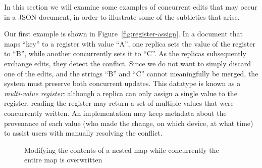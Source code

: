 \documentclass[a4paper,twocolumn,10pt]{article}
\begin{document}
In this section we will examine some examples of concurrent edits that may occur in a JSON document, in order to illustrate some of the subtleties that arise.

Our first example is shown in Figure~\ref{fig:register-assign}. In a document that maps ``key'' to a register with value ``A'', one replica sets the value of the register to ``B'', while another concurrently sets it to ``C''. As the replicas subsequently exchange edits, they detect the conflict. Since we do not want to simply discard one of the edits, and the strings ``B'' and ``C'' cannot meaningfully be merged, the system must preserve both concurrent updates. This datatype is known as a \emph{multi-value register}: although a replica can only assign a single value to the register, reading the register may return a set of multiple values that were concurrently written. An implementation may keep metadata about the provenance of each value (who made the change, on which device, at what time) to assist users with manually resolving the conflict.

\begin{figure*}
\centering
{}
\caption{Modifying the contents of a nested map while concurrently the entire map is overwritten}\label{fig:map-remove}
\end{figure*}
\end{document}
